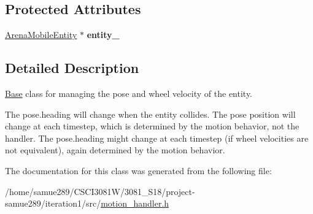 \subsection*{Protected Attributes}
\begin{DoxyCompactItemize}
\item 
\hyperlink{classArenaMobileEntity}{Arena\+Mobile\+Entity} $\ast$ {\bfseries entity\+\_\+}\hypertarget{classMotionHandler_a659fd1ec8878260a63779bf45681f5a4}{}\label{classMotionHandler_a659fd1ec8878260a63779bf45681f5a4}

\end{DoxyCompactItemize}


\subsection{Detailed Description}
\hyperlink{classBase}{Base} class for managing the pose and wheel velocity of the entity. 

The pose.\+heading will change when the entity collides. The pose position will change at each timestep, which is determined by the motion behavior, not the handler. The pose.\+heading might change at each timestep (if wheel velocities are not equivalent), again determined by the motion behavior. 

The documentation for this class was generated from the following file\+:\begin{DoxyCompactItemize}
\item 
/home/samue289/\+C\+S\+C\+I3081\+W/3081\+\_\+\+S18/project-\/samue289/iteration1/src/\hyperlink{motion__handler_8h}{motion\+\_\+handler.\+h}\end{DoxyCompactItemize}
